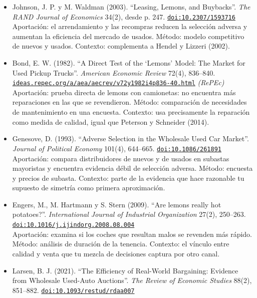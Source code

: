 \documentclass[11pt]{article}
\begin{document}
\begin{itemize}
\item Johnson, J. P. y M. Waldman (2003). ``Leasing, Lemons, and Buybacks''. \textit{The RAND Journal of Economics} 34(2), desde p. 247. \href{https://doi.org/10.2307/1593716}{\texttt{doi:10.2307/1593716}}\\
Aportación: el arrendamiento y las recompras reducen la selección adversa y aumentan la eficiencia del mercado de usados. Método: modelo competitivo de nuevos y usados. Contexto: complementa a Hendel y Lizzeri (2002).
\item Bond, E. W. (1982). ``A Direct Test of the `Lemons' Model: The Market for Used Pickup Trucks''. \textit{American Economic Review} 72(4), 836--840. \href{https://ideas.repec.org/a/aea/aecrev/v72y1982i4p836-40.html}{\texttt{ideas.repec.org/a/aea/aecrev/v72y1982i4p836-40.html}} \textit{(RePEc)}\\
Aportación: prueba directa de lemons con camionetas: no encuentra más reparaciones en las que se revendieron. Método: comparación de necesidades de mantenimiento en una encuesta. Contexto: usa precisamente la reparación como medida de calidad, igual que Peterson y Schneider (2014).
\item Genesove, D. (1993). ``Adverse Selection in the Wholesale Used Car Market''. \textit{Journal of Political Economy} 101(4), 644--665. \href{https://doi.org/10.1086/261891}{\texttt{doi:10.1086/261891}}\\
Aportación: compara distribuidores de nuevos y de usados en subastas mayoristas y encuentra evidencia débil de selección adversa. Método: encuesta y precios de subasta. Contexto: parte de la evidencia que hace razonable tu supuesto de simetría como primera aproximación.
\item Engers, M., M. Hartmann y S. Stern (2009). ``Are lemons really hot potatoes?''. \textit{International Journal of Industrial Organization} 27(2), 250--263. \href{https://doi.org/10.1016/j.ijindorg.2008.08.004}{\texttt{doi:10.1016/j.ijindorg.2008.08.004}}\\
Aportación: examina si los coches que resultan malos se revenden más rápido. Método: análisis de duración de la tenencia. Contexto: el vínculo entre calidad y venta que tu mezcla de decisiones captura por otro canal.
\item Larsen, B. J. (2021). ``The Efficiency of Real-World Bargaining: Evidence from Wholesale Used-Auto Auctions''. \textit{The Review of Economic Studies} 88(2), 851--882. \href{https://doi.org/10.1093/restud/rdaa007}{\texttt{doi:10.1093/restud/rdaa007}}\\

\end{itemize}
\end{document}
